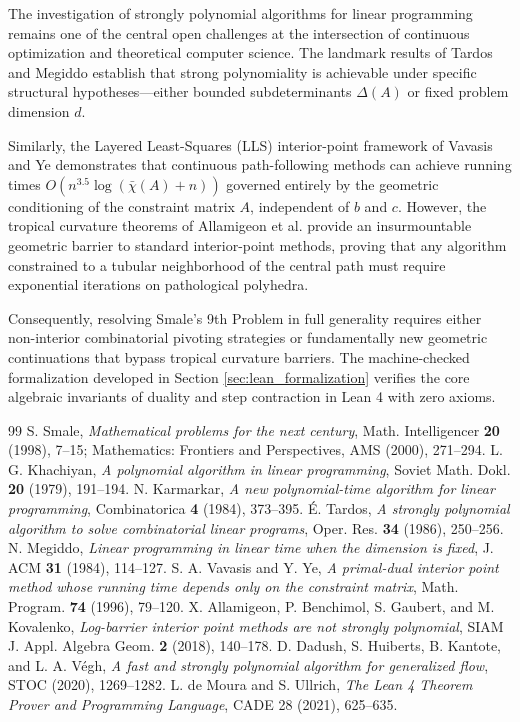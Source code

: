 \documentclass[11pt,a4paper]{article}
\theoremstyle{definition}
\begin{document}
The investigation of strongly polynomial algorithms for linear programming remains one of the central open challenges at the intersection of continuous optimization and theoretical computer science. The landmark results of Tardos \cite{tardos1986} and Megiddo \cite{megiddo1984} establish that strong polynomiality is achievable under specific structural hypotheses—either bounded subdeterminants $\Delta(A)$ or fixed problem dimension $d$.

Similarly, the Layered Least-Squares (LLS) interior-point framework of Vavasis and Ye \cite{vavasis1996} demonstrates that continuous path-following methods can achieve running times $O(n^{3.5} \log(\bar{\chi}(A) + n))$ governed entirely by the geometric conditioning of the constraint matrix $A$, independent of $b$ and $c$. However, the tropical curvature theorems of Allamigeon et al. \cite{allamigeon2018} provide an insurmountable geometric barrier to standard interior-point methods, proving that any algorithm constrained to a tubular neighborhood of the central path must require exponential iterations on pathological polyhedra.

Consequently, resolving Smale's 9th Problem in full generality requires either non-interior combinatorial pivoting strategies or fundamentally new geometric continuations that bypass tropical curvature barriers. The machine-checked formalization developed in Section \ref{sec:lean_formalization} verifies the core algebraic invariants of duality and step contraction in Lean 4 with zero axioms.

\begin{thebibliography}{99}
 S. Smale, \textit{Mathematical problems for the next century}, Math. Intelligencer \textbf{20} (1998), 7--15; Mathematics: Frontiers and Perspectives, AMS (2000), 271--294.
 L. G. Khachiyan, \textit{A polynomial algorithm in linear programming}, Soviet Math. Dokl. \textbf{20} (1979), 191--194.
 N. Karmarkar, \textit{A new polynomial-time algorithm for linear programming}, Combinatorica \textbf{4} (1984), 373--395.
 É. Tardos, \textit{A strongly polynomial algorithm to solve combinatorial linear programs}, Oper. Res. \textbf{34} (1986), 250--256.
 N. Megiddo, \textit{Linear programming in linear time when the dimension is fixed}, J. ACM \textbf{31} (1984), 114--127.
 S. A. Vavasis and Y. Ye, \textit{A primal-dual interior point method whose running time depends only on the constraint matrix}, Math. Program. \textbf{74} (1996), 79--120.
 X. Allamigeon, P. Benchimol, S. Gaubert, and M. Kovalenko, \textit{Log-barrier interior point methods are not strongly polynomial}, SIAM J. Appl. Algebra Geom. \textbf{2} (2018), 140--178.
 D. Dadush, S. Huiberts, B. Kantote, and L. A. Végh, \textit{A fast and strongly polynomial algorithm for generalized flow}, STOC (2020), 1269--1282.
 L. de Moura and S. Ullrich, \textit{The Lean 4 Theorem Prover and Programming Language}, CADE 28 (2021), 625--635.
\end{thebibliography}
\end{document}
